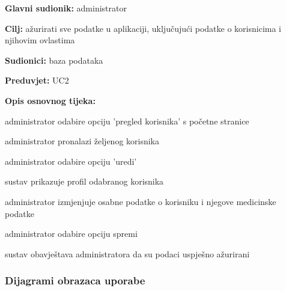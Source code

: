         
                    \noindent {}
					\begin{packed_item}
	
						\item \textbf{Glavni sudionik: }administrator
						\item  \textbf{Cilj:} ažurirati sve podatke u aplikaciji, uključujući podatke o korisnicima i njihovim ovlastima
						\item  \textbf{Sudionici:} baza podataka
						\item  \textbf{Preduvjet:} UC2
						\item  \textbf{Opis osnovnog tijeka:}
						
						\item[] \begin{packed_enum}
							\item administrator odabire opciju 'pregled korisnika' s početne stranice
							\item administrator pronalazi željenog korisnika
							\item administrator odabire opciju 'uredi'
							\item sustav prikazuje profil odabranog korisnika
							\item administrator izmjenjuje osabne podatke o korisniku i njegove medicinske podatke
							\item administrator odabire opciju spremi
							\item sustav obavještava administratora da su podaci uspješno ažurirani
						
						\end{packed_enum}
					
					\end{packed_item}

    
				\subsubsection{Dijagrami obrazaca uporabe}
					
